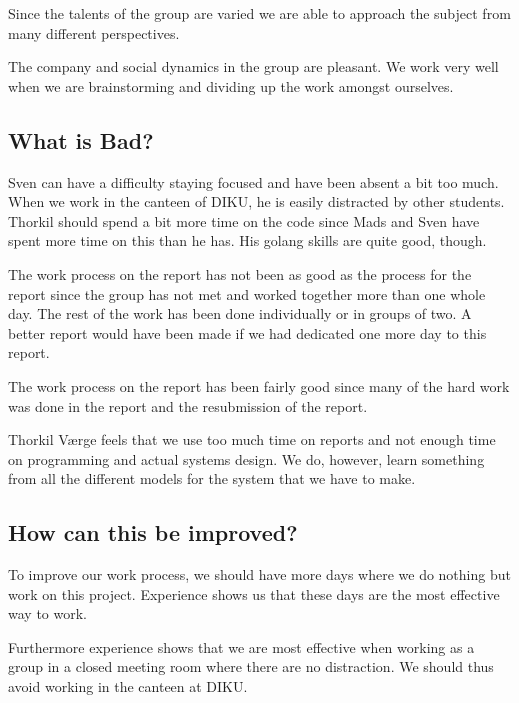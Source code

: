 \documentclass[11pt,a4paper]{report}
\begin{document}
Since the talents of the group are varied we are able to approach the subject from many different perspectives.

The company and social dynamics in the group are pleasant. We work very well when we are brainstorming and dividing up the work amongst ourselves.

\subsection{What is Bad?}
Sven can have a difficulty staying focused and have been absent a bit too much. When we work in the canteen of DIKU, he is easily distracted by other students. Thorkil should spend a bit more time on the code since Mads and Sven have spent more time on this than he has. His golang skills are quite good, though.

The work process on the  report has not been as good as the process for the  report since the group has not met and worked together more than one whole day. The rest of the work has been done individually or in groups of two. A better report would have been made if we had dedicated one more day to this report.

The work process on the  report has been fairly good since many of the hard work was done in the  report and the resubmission of the  report.

Thorkil Værge feels that we use too much time on reports and not enough time on programming and actual systems design. We do, however, learn something from all the different models for the system that we have to make.

\subsection{How can this be improved?}
To improve our work process, we should have more days where we do nothing but work on this project. Experience shows us that these days are the most effective way to work.

Furthermore experience shows that we are most effective when working as a group in a closed meeting room where there are no distraction. We should thus avoid working in the canteen at DIKU.
\end{document}
